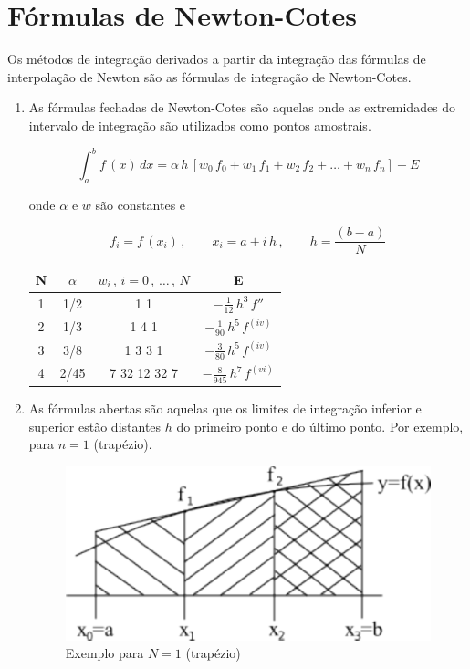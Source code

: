 \section{Fórmulas de Newton-Cotes}

Os métodos de integração derivados a partir da integração das fórmulas de interpolação de Newton são as fórmulas de integração de Newton-Cotes.

\begin{enumerate}
 \item

As fórmulas fechadas de Newton-Cotes são aquelas onde as extremidades do intervalo de integração são utilizados como pontos amostrais.

\[
 \int_a^b f\,(x) \, dx = \alpha \, h \, \left[ w_0\,f_0 + w_1\,f_1 + w_2\,f_2 + \ldots + w_n\,f_n \right] + E
\]

onde $\alpha$ e $w$ são constantes e

\[
 f_i = f\,(x_i)\,, \qquad x_i = a + i\,h\,, \qquad h = \frac{(b-a)}{N}
\]

{
\footnotesize
\begin{center}
\begin{tabular}{|c|c|c|c|}
	\hline		
	\textbf{N} & \textbf{$\alpha$} & \textbf{$w_i\,,\,i=0\,,\,\ldots\,,\,N$} & \textbf{E} \\
	\hline \hline
	1 & 1/2 & 1 1 & $- \displaystyle \frac{1}{12} \, h^3 \, f''$ \\
	\hline 
	2 & 1/3 & 1 4 1 & $- \displaystyle \frac{1}{90} \, h^5 \, f^{(iv)}$ \\
	\hline 
	3 & 3/8 & 1 3 3 1 & $- \displaystyle \frac{3}{80} \, h^5 \, f^{(iv)}$ \\
	\hline 
	4 & 2/45 & 7 32 12 32 7 & $- \displaystyle \frac{8}{945} \, h^7 \, f^{(vi)}$ \\
	\hline 
\end{tabular}
\end{center}
\label{cap2:sec5:tab1}
}

\item

As fórmulas abertas são aquelas que os limites de integração inferior e superior estão distantes $h$ do primeiro ponto e do último ponto. Por exemplo, para $n = 1$ (trapézio).

\begin{figure}[htb]
 \centering
 \includegraphics[scale=1.0]{capitulos/capitulo2/figuras/formula_newton_cotes1.pdf}
 \caption{Exemplo para $N = 1$ (trapézio)}
 \label{fig:formula_newton_cotes1}
\end{figure}


\end{enumerate}
